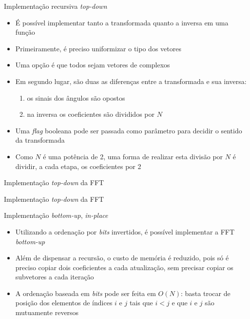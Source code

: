 \begin{frame}[fragile]{Implementação recursiva {\it top-down}}

    \begin{itemize}
        \item É possível implementar tanto a transformada quanto a inversa em uma função

        \item Primeiramente, é preciso uniformizar o tipo dos vetores

        \item Uma opção é que todos sejam vetores de complexos

        \item Em segundo lugar, são duas as diferenças entre a transformada e sua inversa:
        \begin{enumerate}
            \item os sinais dos ângulos são opostos
            \item na inversa os coeficientes são divididos por $N$
        \end{enumerate}

        \item Uma \textit{flag} booleana pode ser passada como parâmetro para decidir o sentido
            da transformada

        \item Como $N$ é uma potência de 2, uma forma de realizar esta divisão por $N$ é dividir,
            a cada etapa, os coeficientes por 2
    \end{itemize}

\end{frame}

\begin{frame}[fragile]{Implementação {\it top-down} da FFT}
\end{frame}

\begin{frame}[fragile]{Implementação {\it top-down} da FFT}
\end{frame}

\begin{frame}[fragile]{Implementação {\it bottom-up}, {\it in-place}}

    \begin{itemize}
        \item Utilizando a ordenação por \textit{bits} invertidos, é possível implementar a FFT
            \textit{bottom-up}

        \item Além de dispensar a recursão, o custo de memória é reduzido, pois só é preciso
            copiar dois coeficientes a cada atualização, sem precisar copiar os subvetores a cada
            iteração

        \item A ordenação baseada em \textit{bits} pode ser feita em $O(N)$: basta trocar de 
            posição dos elementos de índices $i$ e $j$ tais que $i < j$ e que $i$ e $j$ são
            mutuamente reversos 
    \end{itemize}

\end{frame}


